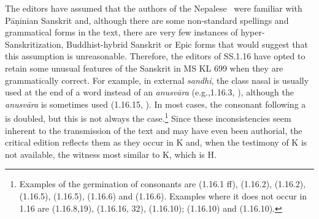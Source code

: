 The editors have assumed that the authors of the Nepalese \SS\ were familiar 
with Pāṇinian Sanskrit and, although there are some non-standard spellings and 
grammatical forms in the text, there are very few instances of 
hyper-Sanskritization, Buddhist-hybrid Sanskrit or Epic forms that would suggest 
that this assumption is unreasonable. Therefore, the editors of SS.1.16 have 
opted to retain some unusual features of the Sanskrit in MS KL 699 when they are 
grammatically correct. For example, in external \emph{sandhi}, the class nasal is 
usually used at the end of a word instead of an \emph{anusvāra} (e.g.,1.16.3, 
), although the \emph{anusvāra} is sometimes used 
(1.16.15, ). In most cases, the consonant following a 
 is doubled, but this is not always the case.\footnote{Examples of 
the germination of consonants are  (1.16.1 ff),  
(1.16.2),  (1.16.2),  (1.16.5),  (1.16.5),  (1.16.6) and  (1.16.6). 
Examples where it does not occur in 1.16 are   (1.16.8,19), 
 (1.16.16, 32),  (1.16.10);  (1.16.10) and  (1.16.10).} Since these 
inconsistencies seem inherent to the transmission of the text and may have even 
been authorial, the critical edition reflects them as they occur in K and, when the 
testimony of K is not available, the witness most similar to K, which is H.





